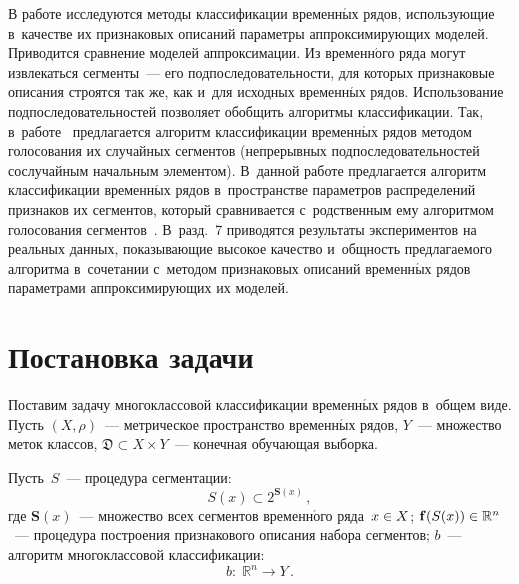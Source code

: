 \begin{multicols}{2}
В работе исследуются методы классификации временн$\acute{\mbox{ы}}$х рядов, использующие 
в~качестве их признаковых описаний параметры аппроксимирующих моделей.
Приводится сравнение моделей аппроксимации.
Из временн$\acute{\mbox{о}}$го ряда могут извлекаться сегменты~--- его 
подпоследовательности, для которых признаковые описания строятся так же, как и~для 
исходных временн$\acute{\mbox{ы}}$х рядов.
Использование подпоследовательностей позволяет обобщить алгоритмы классификации.
 Так, в~работе~\cite{geurts2005segment} предлагается алгоритм классификации 
 временн$\acute{\mbox{ы}}$х\linebreak
  рядов методом голосования их случайных сегментов 
 (непрерывных подпоследовательностей со\linebreak случайным начальным элементом).
В~данной\linebreak
 работе предлагается алгоритм классификации вре\-мен\-н$\acute{\mbox{ы}}$х рядов в~пространстве 
параметров распределений признаков их сегментов, который сравнивается с~родственным 
ему алгоритмом голосования сегментов~\cite{geurts2005segment}.
В~разд.~7 приводятся результаты экспериментов на реальных данных, показывающие 
высокое качество и~общность предлагаемого алгоритма в~сочетании с~методом 
признаковых описаний временн$\acute{\mbox{ы}}$х рядов параметрами аппроксимирующих их моделей.


\section{Постановка задачи}

Поставим задачу многоклассовой классификации временн$\acute{\mbox{ы}}$х рядов в~общем виде.
Пусть $(X,\rho)$~--- метрическое пространство временн$\acute{\mbox{ы}}$х рядов, 
$Y$~--- множество меток классов, $\mathfrak{D}\subset X\times Y$~--- 
конечная обучающая выборка.

Пусть~$S$~--- процедура сегментации:
  \begin{equation}
  \label{eq:segmentation}
  S(x)\subset 2^{\mathbf{S}(x)}\,,
  \end{equation}
  где $\mathbf{S}(x)$~--- множество всех сегментов временн$\acute{\mbox{о}}$го ряда~$x\hm\in X$;
  $\mathbf{f}(S(x))\hm\in\mathbb{R}^n$~--- процедура по\-стро\-ения 
  признакового описания набора сегментов;
  $b$~--- алгоритм многоклассовой классификации:
  \begin{equation}
  \label{eq:classification}
  b:\;\mathbb{R}^n\to Y\,.
  \end{equation}


\end{multicols}
